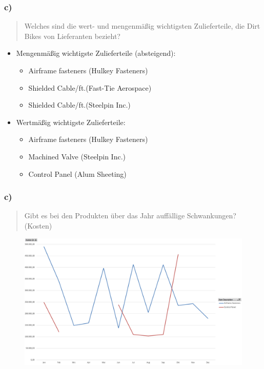 \documentclass{beamer}
\begin{document}
\begin{frame}
\frametitle{c)}

\begin{quote}
Welches sind die wert- und mengenm\"aßig wichtigsten Zulieferteile, die Dirt Bikes von Lieferanten bezieht?
\end{quote}

\begin{itemize}
\setlength{\itemsep}{14pt}
\item Mengenm\"aßig wichtigste Zulieferteile (absteigend):
\begin{itemize}
\item Airframe fasteners (Hulkey Fasteners)
\item Shielded Cable/ft.(Fast-Tie Aerospace)
\item Shielded Cable/ft.(Steelpin Inc.)
\end{itemize}
\item Wertm\"aßig wichtigste Zulieferteile: 
\begin{itemize}
\item Airframe fasteners (Hulkey Fasteners)
\item Machined Valve (Steelpin Inc.)
\item Control Panel (Alum Sheeting)
\end{itemize}
\end{itemize}

\end{frame}

\begin{frame}
\frametitle{c)}

\begin{quote}
Gibt es bei den Produkten über das Jahr auff\"allige Schwankungen? (Kosten)
\end{quote}

\begin{figure}
\includegraphics[scale=0.34]{pivot_itemNO_costs2.PNG}
\end{figure}

\end{frame}
\end{document}
